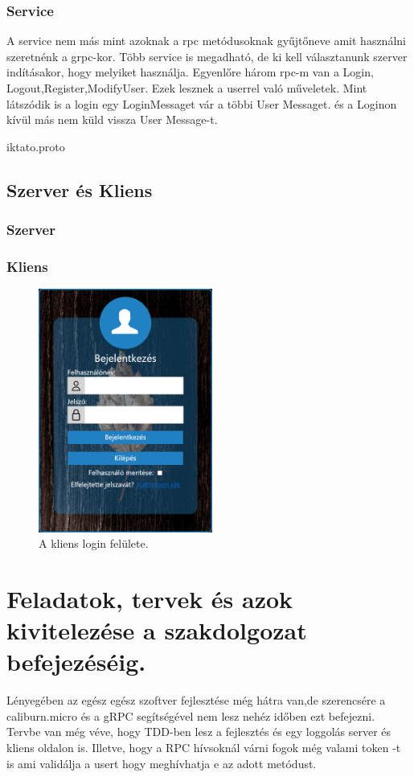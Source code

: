 \documentclass[conference]{IEEEtran}
\begin{document}
\subsubsection{Service}

A service nem más mint azoknak a rpc metódusoknak gyűjtőneve amit használni szeretnénk a grpc-kor. Több service is megadható, de ki kell választanunk szerver indításakor, hogy melyiket használja. Egyenlőre három rpc-m van a Login, Logout,Register,ModifyUser. Ezek lesznek a userrel való műveletek. Mint látszódik is a login egy LoginMessaget vár a többi User Messaget. és a Loginon kívül más nem küld vissza User Message-t.

\begin{lstinputlisting}{iktato.proto}
	
\end{lstinputlisting}
\subsection{\textbf{Szerver és Kliens}}

\subsubsection{Szerver}


\subsubsection{Kliens}
\begin{figure}[htbp]
	\centerline {\includegraphics[height=8cm,keepaspectratio]{login.png}}
	\caption{A kliens login felülete.}
	\label{fig1}
\end{figure}

\section*{Feladatok, tervek és azok kivitelezése a szakdolgozat befejezéséig.}
Lényegében az egész egész szoftver fejlesztése még hátra van,de szerencsére a caliburn.micro és a gRPC segítségével nem lesz nehéz időben ezt befejezni. Tervbe van még véve, hogy TDD-ben lesz a fejlesztés és egy loggolás server és kliens oldalon is. Illetve, hogy a RPC hívsoknál várni fogok még valami token -t is ami validálja a usert hogy meghívhatja e az adott metódust.
\end{document}

